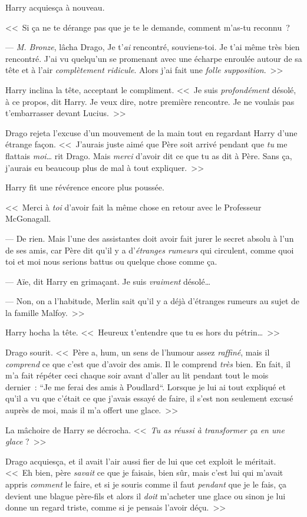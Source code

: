 Harry acquiesça à nouveau.

<<~Si ça ne te dérange pas que je te le demande, comment m'as-tu reconnu~?

--- \emph{M. Bronze}, lâcha Drago, Je t'\emph{ai} rencontré, souviens-toi. Je t'ai même très bien rencontré. J'ai vu quelqu'un se promenant avec une écharpe enroulée autour de sa tête et à l'air \emph{complètement ridicule}. Alors j'ai fait une \emph{folle supposition}.~>>

Harry inclina la tête, acceptant le compliment. <<~Je suis \emph{profondément} désolé, à ce propos, dit Harry. Je veux dire, notre première rencontre. Je ne voulais pas t'embarrasser devant Lucius.~>>

Drago rejeta l'excuse d'un mouvement de la main tout en regardant Harry d'une étrange façon. <<~J'aurais juste aimé que Père soit arrivé pendant que \emph{tu} me flattais \emph{moi}… rit Drago. Mais \emph{merci} d'avoir dit ce que tu as dit à Père. Sans ça, j'aurais eu beaucoup plus de mal à tout expliquer.~>>

Harry fit une révérence encore plus poussée.

<<~Merci à \emph{toi} d'avoir fait la même chose en retour avec le Professeur McGonagall.

--- De rien. Mais l'une des assistantes doit avoir fait jurer le secret absolu à l'un de ses amis, car Père dit qu'il y a d'\emph{étranges rumeurs} qui circulent, comme quoi toi et moi nous serions battus ou quelque chose comme ça.

--- Aïe, dit Harry en grimaçant. Je suis \emph{vraiment} désolé…

--- Non, on a l'habitude, Merlin sait qu'il y a déjà d'étranges rumeurs au sujet de la famille Malfoy.~>>

Harry hocha la tête. <<~Heureux t'entendre que tu es hors du pétrin…~>>

Drago sourit. <<~Père a, hum, un sens de l'humour assez \emph{raffiné}, mais il \emph{comprend} ce que c'est que d'avoir des amis. Il le comprend \emph{très} bien. En fait, il m'a fait répéter ceci chaque soir avant d'aller au lit pendant tout le mois dernier~: “Je me ferai des amis à Poudlard“. Lorsque je lui ai tout expliqué et qu'il a vu que c'était ce que j'avais essayé de faire, il s'est non seulement excusé auprès de moi, mais il m'a offert une glace.~>>

La mâchoire de Harry se décrocha. <<~\emph{Tu as réussi à transformer ça en une glace} ?~>>

Drago acquiesça, et il avait l'air aussi fier de lui que cet exploit le méritait. <<~Eh bien, père \emph{savait} ce que je faisais, bien sûr, mais c'est lui qui m'avait appris \emph{comment} le faire, et si je souris comme il faut \emph{pendant} que je le fais, ça devient une blague père-fils et alors il \emph{doit} m'acheter une glace ou sinon je lui donne un regard triste, comme si je pensais l'avoir déçu.~>>

